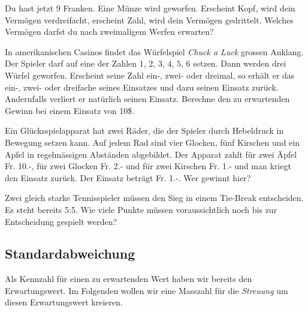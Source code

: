 \documentclass[%
11pt,%
twoside,%
titlepage,%
german,%
headsepline%
]{scrartcl}
\begin{document}
\begin{ueb}
Du hast jetzt 9 Franken. Eine Münze wird geworfen. Erscheint \glqq Kopf\grqq, wird dein Vermögen verdreifacht, erscheint \glqq Zahl\grqq, wird dein Vermögen gedrittelt. Welches Vermögen darfst du nach zweimaligem Werfen erwarten?
\end{ueb}

\begin{ueb}
In amerikanischen Casinos findet das Würfelspiel \emph{Chuck a Luck} grossen Anklang. Der Spieler darf auf eine der Zahlen $1$, $2$, $3$, $4$, $5$, $6$ setzen. Dann werden drei Würfel geworfen. Erscheint seine Zahl ein-, zwei- oder dreimal, so erhält er das ein-, zwei- oder dreifache seines Einsatzes und dazu seinen Einsatz zurück. Andernfalls verliert er natürlich seinen Einsatz. Berechne den zu erwartenden Gewinn bei einem Einsatz von 10\$.
\end{ueb}

\begin{ueb}
Ein Glücks\-spiel\-apparat hat zwei Räder, die der Spieler durch Hebeldruck in Bewegung setzen kann. Auf jedem Rad sind vier Glocken, fünf Kirschen und ein Apfel in regelmässigen Abständen abgebildet. Der Apparat zahlt für zwei Äpfel Fr. 10.-, für zwei Glocken Fr. 2.- und für zwei Kirschen Fr. 1.- und man kriegt den Einsatz zurück. Der
Einsatz beträgt Fr. 1.-. Wer gewinnt hier?
\end{ueb}

\begin{ueb}
Zwei
gleich starke Tennisspieler müssen den Sieg in einem Tie-Break entscheiden. Es steht bereits 5:5. Wie viele Punkte müssen voraussichtlich noch bis zur Entscheidung gespielt werden?
\end{ueb}

\subsection{Standardabweichung}

Als Kennzahl für einen zu erwartenden Wert haben wir bereits den Erwartungswert. Im Folgenden wollen wir eine Masszahl für die \emph{Streuung} um diesen Erwartungswert kreieren.
\end{document}

